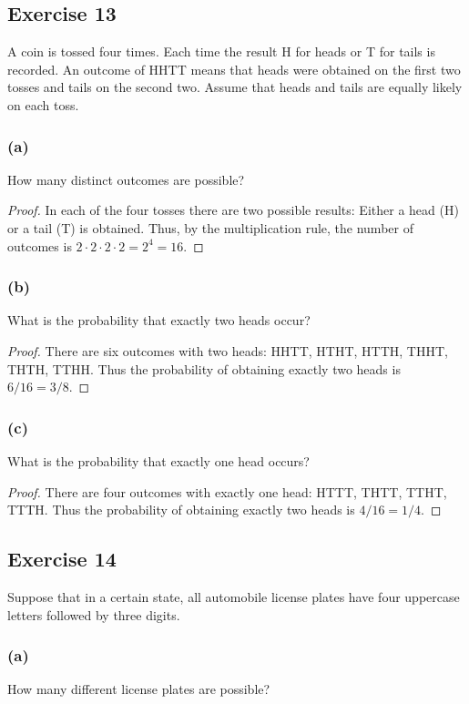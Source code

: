 \documentclass[14pt]{extarticle}
\begin{document}
\subsection{Exercise 13}
A coin is tossed four times. Each time the result H for heads or T for tails is recorded. An outcome of HHTT means that heads were obtained on the first two tosses and tails on the second two. Assume that heads and tails are equally likely on each toss.

\subsubsection{(a)}
How many distinct outcomes are possible?

\begin{proof}
In each of the four tosses there are two possible results: Either a head (H) or a tail (T) is obtained. Thus, by the 
multiplication rule, the number of outcomes is \(2 \cdot 2 \cdot 2 \cdot 2 = 2^4 = 16\).
\end{proof}

\subsubsection{(b)}
What is the probability that exactly two heads occur?

\begin{proof}
There are six outcomes with two heads: HHTT, HTHT, HTTH, THHT, THTH, TTHH. Thus the probability of obtaining exactly 
two heads is \(6/16 = 3/8\).
\end{proof}

\subsubsection{(c)}
What is the probability that exactly one head occurs?

\begin{proof}
There are four outcomes with exactly one head: HTTT, THTT, TTHT, TTTH. Thus the probability of obtaining exactly two 
heads is \(4/16 = 1/4\).
\end{proof}

\subsection{Exercise 14}
Suppose that in a certain state, all automobile license plates have four uppercase letters followed by three 
digits.

\subsubsection{(a)}
How many different license plates are possible?
\end{document}
